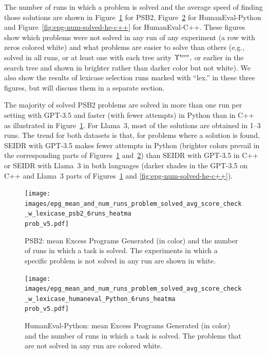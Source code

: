 The number of runs in which a problem is solved and the average speed of finding those solutions are shown in Figure~\ref{fig:epg-num-solved-psb2} for PSB2, Figure~\ref{fig:epg-num-solved-he-python}
for HumanEval-Python and Figure~\ref{fig:epg-num-solved-he-c++} for HumanEval-C++.
These figures show which problems were not solved in any run of any experiment (a row with zeros colored white) and what problems are easier to solve than others (e.g., solved in all runs, or at least one with each tree arity $\Upsilon^\text{tree},$ or earlier in the search tree and shown in brighter rather than darker color but not white). 
We also show the results of lexicase selection runs marked with ``lex.'' in these three figures, but will discuss them in a separate section. 

The majority of solved PSB2 problems are solved in more than one run per setting with GPT-3.5 and faster (with fewer attempts) in Python than in C++ as illustrated in Figure~\ref{fig:epg-num-solved-psb2}.
For Llama~3, most of the solutions are obtained in 1--3 runs.
The trend for both datasets is that, for problems where a solution is found, SEIDR with GPT-3.5 makes fewer attempts in Python (brighter colors prevail in the corresponding parts of Figures~\ref{fig:epg-num-solved-psb2} and~\ref{fig:epg-num-solved-he-python}) than SEIDR with GPT-3.5 in C++ or SEIDR with Llama~3 in both languages (darker shades in the GPT-3.5 on C++ and Llama~3 parts of Figures~\ref{fig:epg-num-solved-psb2} and \ref{fig:epg-num-solved-he-c++}).


\begin{figure}
  \centering
  \texttt{[image: images/epg\_mean\_and\_num\_runs\_problem\_solved\_avg\_score\_check\_w\_lexicase\_psb2\_6runs\_heatma\\prob\_v5.pdf]}
  \caption{PSB2: mean Excess Programs Generated (in color) and the number of runs in which a task is solved. The experiments in which a specific problem is not solved in any run are shown in white.}
  \label{fig:epg-num-solved-psb2}
\end{figure}

\begin{figure}
  \centering
  \texttt{[image: images/epg\_mean\_and\_num\_runs\_problem\_solved\_avg\_score\_check\_w\_lexicase\_humaneval\_Python\_6runs\_heatma\\prob\_v5.pdf]}
  \vspace{-4pt}
  \caption{HumanEval-Python: mean Excess Programs Generated (in color) and the number of runs in which a task is solved. The problems that are not solved in any run are colored white.}
  \label{fig:epg-num-solved-he-python}
  \vspace{-12pt}
\end{figure}

